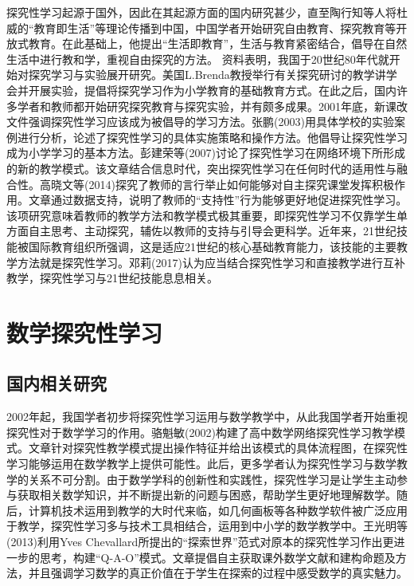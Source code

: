 探究性学习起源于国外，因此在其起源方面的国内研究甚少，直至陶行知等人将杜威的“教育即生活”等理论传播到中国，中国学者开始研究自由教育、探究教育等开放式教育。在此基础上，他提出“生活即教育”，生活与教育紧密结合，倡导在自然生活中进行教和学，重视自由探究的方法。
资料表明，我国于20世纪80年代就开始对探究学习与实验展开研究。美国L.Brenda教授举行有关探究研讨的教学讲学会并开展实验，提倡将探究学习作为小学教育的基础教育方式。在此之后，国内许多学者和教师都开始研究探究教育与探究实验，并有颇多成果。2001年底，新课改文件强调探究性学习应该成为被倡导的学习方法。张鹏(2003)用具体学校的实验案例进行分析，论述了探究性学习的具体实施策略和操作方法\cite{张鹏2003让探究性学习成为学生学习的基本方式}。他倡导让探究性学习成为小学学习的基本方法。彭建荣等(2007)讨论了探究性学习在网络环境下所形成的新的教学模式\cite{彭建荣2007论信息时代的探究性学习}。该文章结合信息时代，突出探究性学习在任何时代的适用性与融合性。高晓文等(2014)探究了教师的言行举止如何能够对自主探究课堂发挥积极作用\cite{高晓文2014教师的}。文章通过数据支持，说明了教师的“支持性”行为能够更好地促进探究性学习。该项研究意味着教师的教学方法和教学模式极其重要，即探究性学习不仅靠学生单方面自主思考、主动探究，辅佐以教师的支持与引导会更科学。近年来，21世纪技能被国际教育组织所强调，这是适应21世纪的核心基础教育能力，该技能的主要教学方法就是探究性学习。邓莉(2017)认为应当结合探究性学习和直接教学进行互补教学，探究性学习与21世纪技能息息相关\cite{邓莉2017如何在教学上落实}。



\section{数学探究性学习}

\subsection{国内相关研究}

2002年起，我国学者初步将探究性学习运用与数学教学中，从此我国学者开始重视探究性对于数学学习的作用。骆魁敏(2002)构建了高中数学网络探究性学习教学模式\cite{骆魁敏2003现代信息技术环境下高中数学研究性学习教学策略初探}。文章针对探究性教学模式提出操作特征并给出该模式的具体流程图，在探究性学习能够运用在数学教学上提供可能性。此后，更多学者认为探究性学习与数学教学的关系不可分割。由于数学学科的创新性和实践性，探究性学习是让学生主动参与获取相关数学知识，并不断提出新的问题与困惑，帮助学生更好地理解数学。随后，计算机技术运用到教学的大时代来临，如几何画板等各种数学软件被广泛应用于教学，探究性学习多与技术工具相结合，运用到中小学的数学教学中。王光明等(2013)利用Yves Chevallard所提出的“探索世界”范式对原本的探究性学习作出更进一步的思考，构建“Q-A-O”模式\cite{王光明2013探索世界}。文章提倡自主获取课外数学文献和建构命题及方法，并且强调学习数学的真正价值在于学生在探索的过程中感受数学的真实魅力。


